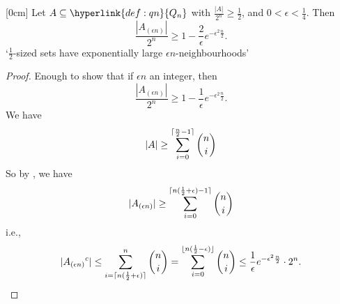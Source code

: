\documentclass{article}
\DeclarePairedDelimiter\ceil{\lceil}{\rceil}
\DeclarePairedDelimiter\floor{\lfloor}{\rfloor}
\let\subset\subseteq
\begin{document}
\begin{nthm}\label{thm:2.5}
  [0cm]
  Let $A \subset \hyperlink{def:qn}{Q_n}$ with $\frac{|A|}{2^n} \geq \frac{1}{2}$, and $0 < \epsilon < \frac{1}{4}$.
  Then
  \begin{equation*}
    \frac{|A_{(\epsilon n)}|}{2^n} \geq 1 - \frac{2}{\epsilon} e^{-\epsilon^2 \frac{n}{2}}.
  \end{equation*}
  `$\frac{1}{2}$-sized sets have exponentially large $\epsilon n$-neighbourhoods'
\end{nthm}
\begin{proof}
  Enough to show that if $\epsilon n$ an integer, then
  \begin{equation*}
    \frac{|A_{(\epsilon n)}|}{2^n} \geq 1 - \frac{1}{\epsilon} e^{-\epsilon^2 \frac{n}{2}}.
  \end{equation*}
  We have
  \begin{equation*}
    |A| \geq \sum_{i=0}^{\ceil{\frac{n}{2} - 1}} \binom{n}{i}
  \end{equation*}
  So by , we have
  \begin{equation*}
    |A_{(\epsilon n)}| \geq \sum_{i=0}^{\ceil{n(\frac{1}{2} + \epsilon) - 1}} \binom{n}{i}
  \end{equation*}
  i.e.,
  \begin{equation*}
    |{A_{(\epsilon n)}}^c| \leq \sum_{i=\ceil{n (\frac{1}{2} + \epsilon)}}^n \binom{n}{i} = \sum_{i=0}^{\floor{n(\frac{1}{2}- \epsilon)}} \binom{n}{i} \leq \frac{1}{\epsilon} e^{-\epsilon^2 \frac{n}{2}} \cdot 2^n. \qedhere
  \end{equation*}
\end{proof}
\end{document}
